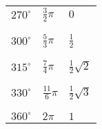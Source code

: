 \documentclass[6pt,a4paper]{scrartcl}
\begin{document}
\begin{multicols*}{3}
\begin{tabular}{lll}
$270^\circ$ & $\frac{3}{2}\pi$  & $0$ \\
\\
\hline
\\
$300^\circ$ & $\frac{5}{3}\pi$  & $\frac{1}{2}$ \\
\\
\hline
\\
$315^\circ$ & $\frac{7}{4}\pi$  & $\frac{1}{2}\sqrt{2}$ \\
\\
\hline
\\
$330^\circ$ & $\frac{11}{6}\pi$ & $\frac{1}{2}\sqrt{3}$ \\
\\
\hline
\\
$360^\circ$ & $2\pi$            & $1$ \\
\end{tabular}


\end{multicols*}


\end{document}
